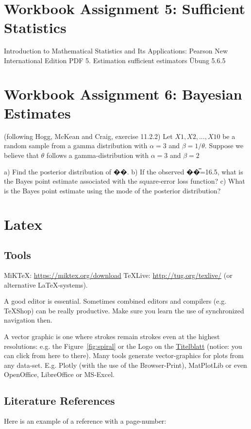 \chapter{Workbook Assignment 5: Sufficient Statistics}	

Introduction to Mathematical Statistics and Its Applications: Pearson New International Edition PDF 
5. Estimation
sufficient estimators
Übung 5.6.5


\chapter{Workbook Assignment 6: Bayesian Estimates}	

(following Hogg, McKean and Craig, exercise 11.2.2)
Let $X1, X2, ... , X10$ be a random sample from a gamma distribution with $\alpha =3$ and $\beta =1/\theta$. Suppose we believe that $\theta$ follows a gamma-distribution with $\alpha =3$ and $\beta = 2$

a) Find the posterior distribution of ��.
b) If the observed ��̅=16.5, what is the Bayes point estimate associated with the square-error loss function?
c) What is the Bayes point estimate using the mode of the posterior distribution?





\chapter{Latex}

\section{Tools}

MiKTeX: \url{https://miktex.org/download}
TeXLive: \url{http://tug.org/texlive/}
 (or alternative LaTeX-systems).
 
 A good editor is essential. Sometimes combined editors and compilers (e.g. TeXShop) can be really productive. Make sure you learn the use of synchronized navigation then.

A vector graphic is one where strokes remain strokes even at the highest resolutions: e.g. the Figure~\ref{fig:spiral} or the Logo on the \hyperref[titlePage]{Titelblatt} (notice: you can click from here to there).
Many tools generate vector-graphics for plots from any data-set. E.g. Plotly (with the use of the Browser-Print), MatPlotLib or even OpenOffice, LibreOffice or MS-Excel.

\section{Literature References}
Here is an example of a reference with a page-number: \cite[S. 6]{DueckKo:2016}


